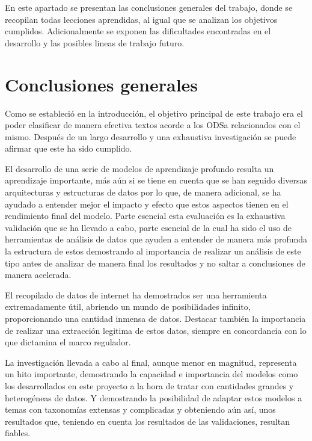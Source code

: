 En este apartado se presentan las conclusiones generales del trabajo, donde se recopilan todas lecciones aprendidas, al igual que se analizan los objetivos cumplidos. Adicionalmente se exponen las dificultades encontradas en el desarrollo y las posibles lineas de trabajo futuro.

\section{Conclusiones generales}
Como se estableció en la introducción, el objetivo principal de este trabajo era el poder clasificar de manera efectiva textos acorde a los \gls{ODSa} relacionados con el mismo. Después de un largo desarrollo y una exhaustiva investigación se puede afirmar que este ha sido cumplido. 

El desarrollo de una serie de modelos de aprendizaje profundo resulta un aprendizaje importante, más aún si se tiene en cuenta que se han seguido diversas arquitecturas y estructuras de datos por lo que, de manera adicional, se ha ayudado a entender mejor el impacto y efecto que estos aspectos tienen en el rendimiento final del modelo. Parte esencial esta evaluación es la exhaustiva validación que se ha llevado a cabo, parte esencial de la cual ha sido el uso de herramientas de análisis de datos que ayuden a entender de manera más profunda la estructura de estos demostrando al importancia de realizar un análisis de este tipo antes de analizar de manera final los resultados y no saltar a conclusiones de manera acelerada. 

El recopilado de datos de internet ha demostrados ser una herramienta extremadamente útil, abriendo un mundo de posibilidades infinito, proporcionando una cantidad inmensa de datos. Destacar también la importancia de realizar una extracción legitima de estos datos, siempre en concordancia con lo que dictamina el marco regulador. 

La investigación llevada a cabo al final, aunque menor en magnitud, representa un hito importante, demostrando la capacidad e importancia del modelos como los desarrollados en este proyecto a la hora de tratar con cantidades grandes y heterogéneas de datos. Y demostrando la posibilidad de adaptar estos modelos a temas con  taxonomías extensas y complicadas y obteniendo aún así, unos resultados que, teniendo en cuenta los resultados de las validaciones,  resultan fiables.

